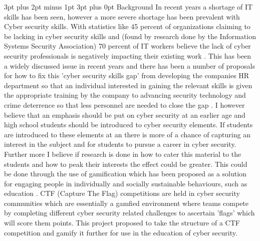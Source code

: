 \documentclass[12pt,a4paper]{article}
\makeatletter
\renewcommand\subsection{\@startsection {subsection}{1}{2mm} %
                               {3pt plus 2pt minus 1pt} %
                               {3pt plus 0pt} %
                               {\normalfont\bfseries}}
\makeatother
\begin{document}
\subsection{Background}  
In recent years a shortage of IT skills has been seen, however a more severe shortage has been prevalent with Cyber security skills. With statistics like 45 percent of organizations claiming to be lacking in cyber security skills and (found by research done by the Information Systems Security Association) 70 percent of IT workers believe the lack of cyber security professionals is negatively impacting their existing work \cite{smith2018intelligent}. This has been a widely discussed issue in recent years and there has been a number of proposals for how to fix this 'cyber security skills gap' from developing the companies HR department so that an individual interested in gaining the relevant skills is given the appropriate training by the company to advancing security technology and crime deterrence so that less personnel are needed to close the gap \cite{cobb2016mind}. I however believe that an emphasis should be put on cyber security at an earlier age and high school students should be introduced to cyber security elements. If students are introduced to these elements at an there is more of a chance of capturing an interest in the subject and for  students to pursue a career in cyber security. Further more I believe if research is done in how to cater this material to the students and how to peak their interests the effect could be greater. This could be done through the use of gamification which has been proposed as a solution for engaging people in individually and socially sustainable behaviours, such as education \cite{su2015mobile}. CTF (Capture The Flag) competitions are held in cyber security communities which are essentially a gamfied environment where teams compete by completing different cyber security related challenges to ascertain 'flags' which will score them points. This project proposed to take the structure of a CTF competition and gamify it further for use in the education of cyber security.  
\end{document}
